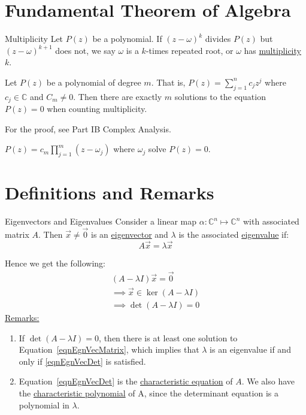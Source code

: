 \documentclass[../Main.tex]{subfiles}
\begin{document}
\section{Fundamental Theorem of Algebra}
\begin{definition}{Multiplicity}
    Let $P(z)$ be a polynomial. If $(z-\omega)^k$ divides $P(z)$ but $(z-\omega)^{k+1}$ does not, we say $\omega$ is a $k$-times repeated root, or $\omega$ has \underline{multiplicity} $k$.
\end{definition}
\begin{theorem}
    Let $P(z)$ be a polynomial of degree $m$. That is, $P(z) = \sum_{j=1}^{n}c_j z^j$ where $c_j \in \mathbb{C}$ and $C_m \neq 0$. Then there are exactly $m$ solutions to the equation $P(z) = 0$ when counting multiplicity.
    \label{thmFundamenalAlgebra}
\end{theorem}
For the proof, see Part IB Complex Analysis.
\begin{corollary}
    $P(z) = c_m \prod_{j=1}^{m}(z-\omega_j)$ where $\omega_j$ solve $P(z) = 0$.
\end{corollary}
\section{Definitions and Remarks}
\begin{definition}{Eigenvectors and Eigenvalues}
    Consider a linear map $\alpha : \mathbb{C}^n \mapsto \mathbb{C}^n$ with associated matrix $A$. Then $\vec{x} \neq \vec{0}$ is an \underline{eigenvector} and $\lambda$ is the associated \underline{eigenvalue} if:
    \begin{equation}
        A \vec{x} = \lambda \vec{x} \label{eqnEgnVecDef}
    \end{equation}
\end{definition}
Hence we get the following:
\begin{eqnarray}
    (A-\lambda I)\vec{x} = \vec{0} \label{eqnEgnVecMatrix}\\
    \implies \vec{x} \in \ker{(A-\lambda I)} \label{eqnEgnVecInKer}\\
    \implies \det{(A-\lambda I)} = 0 \label{eqnEgnVecDet}
\end{eqnarray}
\underline{Remarks:}
\begin{enumerate}
    \item If $\det{(A-\lambda I)} = 0$, then there is at least one solution to Equation~\ref{eqnEgnVecMatrix}, which implies that $\lambda$ is an eigenvalue if and only if \ref{eqnEgnVecDet} is satisfied.
    \item Equation~\ref{eqnEgnVecDet} is the \underline{characteristic equation} of $A$. We also have the \underline{characteristic polynomial} of A, since the determinant equation is a polynomial in $\lambda$.
\end{enumerate}
\end{document}
